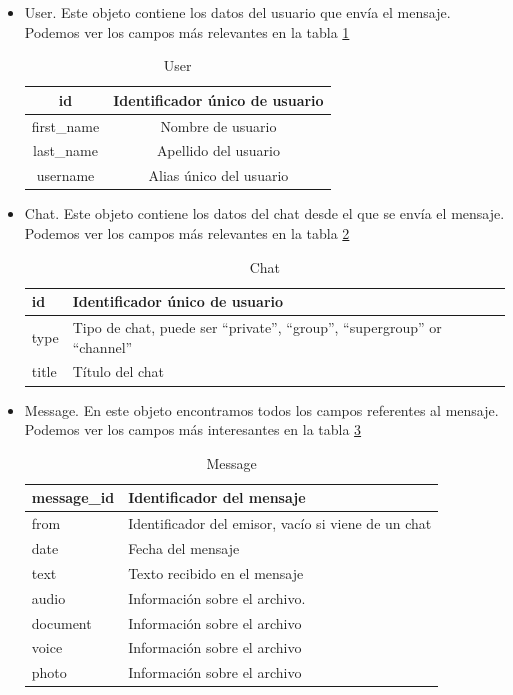 \documentclass[10pt,journal,compsoc]{IEEEtran}
\begin{document}
\begin{itemize}
  \item User. Este objeto contiene los datos del usuario que envía el mensaje.
 Podemos ver los campos más relevantes en la tabla \ref{tab:User}
  
  \begin{table}[h]
  \centering
  \begin{tabular}{cc}
  id  & Identificador único de usuario \\ \hline
  first\_name & Nombre de usuario \\ \hline
  last\_name & Apellido del usuario \\ \hline
  username & Alias único del usuario \\ \hline
  \end{tabular} 
  \caption{User}
  \label{tab:User}
  \end{table}

  \item Chat. Este objeto contiene los datos del chat desde el que se envía el 
  mensaje. Podemos ver los campos más relevantes en la tabla \ref{tab:Chat}
  
   \begin{table}[h]
  \centering
  \begin{tabular}{>{\centering\arraybackslash}m{1cm} >{\centering\arraybackslash}m{4cm}}
  id  & Identificador único de usuario \\ \hline
  type & Tipo de chat, puede ser “private”, “group”, “supergroup” or “channel” 
  \\ \hline
  title & Título del chat \\ \hline
  \end{tabular} 
  \caption{Chat}
  \label{tab:Chat}
  \end{table}
  
  \item Message. En este objeto encontramos todos los campos referentes al 
  mensaje. Podemos ver los campos más interesantes en la tabla \ref{tab:Message}
  
   \begin{table}[h]
  \centering
  \begin{tabular}{>{\centering\arraybackslash}m{1cm} >{\centering\arraybackslash}m{4cm}}
  message\_id  & Identificador del mensaje \\ \hline
  from & Identificador del emisor, vacío si viene de un chat \\ \hline
  date & Fecha del mensaje \\ \hline
  text & Texto recibido en el mensaje \\ \hline
  audio & Información sobre el archivo. \\ \hline
  document & Información sobre el archivo \\ \hline
  voice & Información sobre el archivo \\ \hline
  photo & Información sobre el archivo \\ \hline
  \end{tabular} 
  \caption{Message}
  \label{tab:Message}
  \end{table}

\end{itemize}
\end{document}
